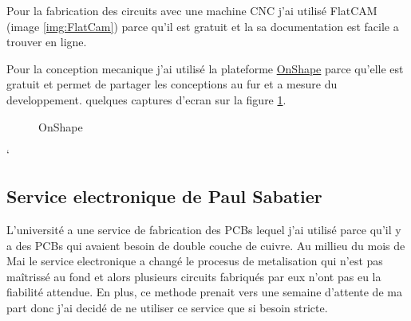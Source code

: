\documentclass[12pt]{article}
\begin{document}
\begin{par}
	Pour la fabrication des circuits avec une machine CNC j'ai
	utilisé FlatCAM (image \ref{img:FlatCam}) parce qu'il est gratuit et la sa documentation
	est facile a trouver en ligne.
\end{par}
\begin{par}
	Pour la conception mecanique j'ai utilis\'e la plateforme \href{https://www.onshape.com/}{OnShape}
	parce qu'elle est gratuit et permet de partager les conceptions au fur et a mesure du developpement.
	quelques captures d'ecran sur la figure \ref{img:onshape_all}.
\end{par}
\begin{figure}[!htb]
	\centering
	\caption{OnShape}
	\label{img:onshape_all}
\end{figure}
`%
\subsection{Service electronique de Paul Sabatier}
\begin{par}
	L'universit\'e a une service de fabrication des PCBs
	lequel j'ai utilis\'e parce qu'il y a des 
	PCBs qui avaient besoin de double couche de cuivre. 
	Au millieu du mois de Mai le service electronique a 
	chang\'e le procesus de metalisation qui n'est pas
	ma\^itriss\'e au fond et alors plusieurs 
	circuits fabriqu\'es par eux n'ont pas eu la fiabilit\'e
	attendue. En plus, ce methode prenait vers une semaine
	d'attente de ma part donc j'ai decid\'e de ne utiliser
	ce service que si besoin stricte.
\end{par}
\end{document}
